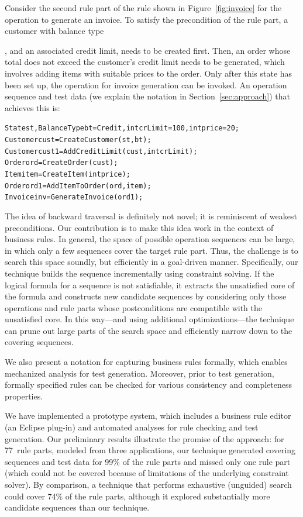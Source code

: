 Consider the second rule part of the rule shown in Figure~\ref{fig:invoice} for
the operation to generate an invoice. To satisfy the precondition of the rule
part, a customer with balance type \subject{Credit}, and an associated credit
limit, needs to be created first. Then, an order whose total does not exceed the
customer's credit limit needs to be generated, which involves adding items with
suitable prices to the order. Only after this state has been set up, the
operation for invoice generation can be invoked. An operation sequence and test
data (we explain the notation in Section~\ref{sec:approach}) that achieves this
is:

\vspace*{-4pt}%
{\scriptsize
\begin{alltt}
 State st, BalanceType bt = Credit,  int crLimit = 100, int price = 20;
 Customer cust = CreateCustomer(st, bt);
 Customer cust1 = AddCreditLimit(cust, int crLimit);
 Order ord = CreateOrder(cust);
 Item item = CreateItem(int price);
 Order ord1 = AddItemToOrder(ord, item);
 Invoice inv = GenerateInvoice(ord1);  
\end{alltt}}%
\vspace*{-5pt}

The idea of backward traversal is definitely not novel; it is reminiscent of
weakest preconditions.  Our contribution is to make this idea work in the
context of business rules.  In general, the space of possible operation
sequences can be large, in which only a few sequences cover the target rule
part. Thus, the challenge is to search this space soundly, but efficiently in a
goal-driven manner. Specifically, our technique builds the sequence
incrementally using constraint solving. If the logical formula for a sequence is
not satisfiable, it extracts the unsatisfied core of the formula and constructs
new candidate sequences by considering only those operations and rule parts
whose postconditions are compatible with the unsatisfied core. In this way---and
using additional optimizations---the technique can prune out large parts of the
search space and efficiently narrow down to the covering sequences.

We also present a notation for capturing business rules formally, which enables
mechanized analysis for test generation. Moreover, prior to test generation,
formally specified rules can be checked for various consistency and completeness
properties.

We have implemented a prototype system, which includes a business rule editor
(an Eclipse plug-in) and automated analyses for rule checking and test
generation. Our preliminary results illustrate the promise of the approach: for
77~rule parts, modeled from three applications, our technique generated covering
sequences and test data for 99\% of the rule parts and missed only one rule part
(which could not be covered because of limitations of the underlying constraint
solver). By comparison, a technique that performs exhaustive (unguided) search
could cover 74\% of the rule parts, although it explored substantially more
candidate sequences than our technique.

